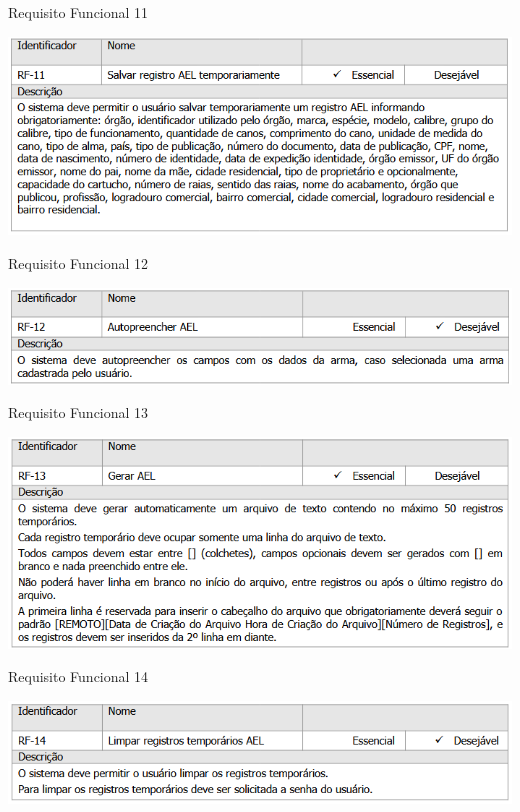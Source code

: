 \begin{table}[H]
    \caption{Requisito Funcional 11}\label{tab:rf11}
    \centering
    \includegraphics[scale=0.8]{imagens/rf11.png}
\end{table}
\begin{table}[H]
    \caption{Requisito Funcional 12}\label{tab:rf12}
    \centering
    \includegraphics[scale=0.8]{imagens/rf12.png}
\end{table}
\begin{table}[H]
    \caption{Requisito Funcional 13}\label{tab:rf13}
    \centering
    \includegraphics[scale=0.8]{imagens/rf13.png}
\end{table}
\begin{table}[H]
    \caption{Requisito Funcional 14}\label{tab:rf14}
    \centering
    \includegraphics[scale=0.8]{imagens/rf14.png}
\end{table}



